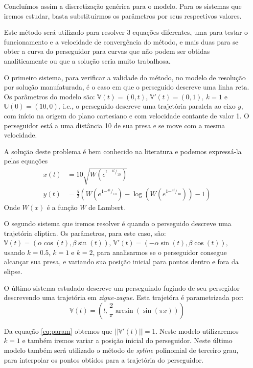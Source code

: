\documentclass[a4paper,10pt]{article}
\begin{document}
  Concluímos assim a discretização genérica para o modelo. Para os sistemas que iremos estudar, basta substituirmos os parâmetros por seus respectivos valores.
  
  Este método será utilizado para resolver 3 equações diferentes, uma para testar o funcionamento e a velocidade de convergência do método, e mais duas para se obter a curva do perseguidor para curvas que não podem ser obtidas analiticamente ou que a solução seria muito trabalhosa. 
  
  O primeiro sistema, para verificar a validade do método, no modelo de resolução por solução manufaturada, é o caso em que o perseguido descreve uma linha reta. Os parâmetros do modelo são: $\mathbb{V}(t) = (0, t)$, $\mathbb{V}'(t) = (0, 1)$, $k = 1$ e $\mathbb{U}(0) = (10, 0)$, i.e., o perseguido descreve uma trajetória paralela ao eixo $y$, com início na origem do plano cartesiano e com velocidade contante de valor 1. O perseguidor está a uma distância 10 de sua presa e se move com a mesma velocidade.
  
  A solução deste problema é bem conhecido na literatura\cite{wolfram} e podemos expressá-la pelas equações
  \begin{align}
   x(t) &= 10\sqrt{W(e^{1 -^{4t}/_{10}})} \\
   y(t) &= \frac{5}{2}(W(e^{1 -^{4t}/_{10}}) - \log{(W(e^{1 -^{4t}/_{10}}))} - 1)   
  \end{align}
  Onde $W(x)$ é a função $W$ de Lambert.
  
  O segundo sistema que iremos resolver é quando o perseguido descreve uma trajetória elíptica. Os parâmetros, para este caso, são: $\mathbb{V}(t) = (\alpha \cos(t), \beta \sin(t))$, $\mathbb{V}'(t) = (-\alpha \sin(t), \beta \cos(t))$, usando $k = 0.5$, $k = 1$ e $k = 2$, para analisarmos se o perseguidor consegue alcançar sua presa, e variando sua posição inicial para pontos dentro e fora da elipse.
  
  O último sistema estudado descreve um perseguindo fugindo de seu persegidor descrevendo uma trajetória em \emph{zigue-zague}. Esta trajetóra é parametrizada por:
  \begin{equation}
   \mathbb{V}(t) =
   (t, \frac{2}{\pi} \arcsin(\sin(\pi x)))
   \label{eq:param}
  \end{equation}
  
  Da equação \ref{eq:param} obtemos que $||\mathbb{V}'(t)|| = 1$. Neste modelo utilizaremos $k = 1$ e também iremos variar a posição inicial do perseguidor. Neste último modelo também será utilizado o método de \emph{spline} polinomial de terceiro grau, para interpolar os pontos obtidos para a trajetória do perseguidor.  
   
\end{document}
